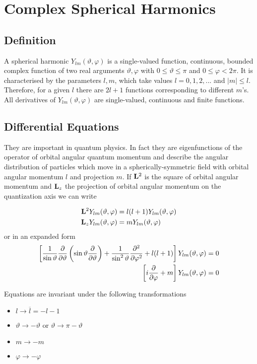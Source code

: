 \section[Complex Spherical ...]{Complex Spherical Harmonics}
\subsection{Definition}
 \par{A spherical harmonic $Y_{lm}(\vartheta,\varphi)$ is a single-valued function,
continuous, bounded complex function of two real arguments $\vartheta,\varphi$ with
$0\le \vartheta \le \pi$ and $0\le \varphi <2\pi$. It is characterised by the
parameters $l,m$, which take values $l=0,1,2,...$ and $|m| \le l$. Therefore, for
a given $l$ there are $2l+1$ functions corresponding to different $m$'s. All
derivatives of $Y_{lm}(\vartheta,\varphi)$ are single-valued, continuous and finite
functions.}
\subsection{Differential Equations}
\par{They are important in quantum physics. In fact they are eigenfunctions of
the operator of orbital angular quantum momentum and describe the angular
distribution of particles which move in a spherically-symmetric field with
orbital angular momentum $l$ and projection $m$. If ${\bf L}^2$ is the square
of orbital angular momentum and ${\bf L}_z$ the projection of orbital angular
momentum on the quantization axis we can write}
 
\begin{equation}
 \begin{split}
 {\bf L}^2Y_{lm}(\vartheta,\varphi)&=l(l+1)Y_{lm}(\vartheta,\varphi)\\
 {\bf L}_zY_{lm}(\vartheta,\varphi)&=mY_{lm}(\vartheta,\varphi)
 \end{split}
 \end{equation}
or in an expanded form
\begin{equation}
\label{sphdiff}
\begin{split}
\left[\frac{1}{\sin \vartheta}\frac{\partial }{\partial \vartheta}\left(\sin \vartheta
    \frac{\partial }{\partial \vartheta}\right)+\frac{1}{\sin^2
    \vartheta}\frac{\partial^{2} }{\partial \varphi^{2}}+l(l+1)\right]Y_{lm}(\vartheta,\varphi)&=0\\
\left[i\frac{\partial }{\partial \varphi}+m\right]Y_{lm}(\vartheta,\varphi)&=0
\end{split}
\end{equation}
\par{Equations  are invariant under the following transformations}
\begin{itemize}
\item $l\rightarrow \overline{l}=-l-1$
\item $\vartheta \rightarrow -\vartheta$ or $\vartheta \rightarrow
  \pi-\vartheta$
\item $m\rightarrow -m$
\item $\varphi \rightarrow -\varphi$
\end{itemize}
